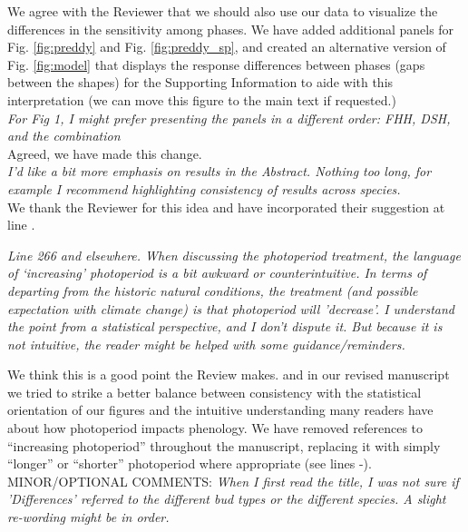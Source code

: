 \documentclass[11pt]{article}
\begin{document}
We agree with the Reviewer that we should also use our data to visualize the differences in the sensitivity among phases. We have added additional panels for Fig. \ref{fig:preddy} and Fig. \ref{fig:preddy_sp}, and created an alternative version of Fig. \ref{fig:model} that displays the response differences between phases (gaps between the shapes) for the Supporting Information to aide with this interpretation (we can move this figure to the main text if requested.) \\ %

\emph{For Fig 1, I might prefer presenting the panels in a different order: FHH, DSH, and the combination}\\

Agreed, we have made this change.\\

\emph{I’d like a bit more emphasis on results in the Abstract. Nothing too long, for example I recommend highlighting consistency of results across species.}\\

We thank the Reviewer for this idea and have incorporated their suggestion at line .

\emph{Line 266 and elsewhere. When discussing the photoperiod treatment, the language of ‘increasing’ photoperiod is a bit awkward or counterintuitive. In terms of departing from the historic natural conditions, the treatment (and possible expectation with climate change) is that photoperiod will 'decrease'. I understand the point from a statistical perspective, and I don’t dispute it. But because it is not intuitive, the reader might be helped with some guidance/reminders.}

We think this is a good point the Review makes. and in our revised manuscript we tried to strike a better balance between consistency with the statistical orientation of our figures and the intuitive understanding many readers have about how photoperiod impacts phenology. We have removed references to ``increasing photoperiod'' throughout the manuscript, replacing it with simply ``longer'' or ``shorter'' photoperiod where appropriate (see lines -).\\


MINOR/OPTIONAL COMMENTS:
\emph{When I first read the title, I was not sure if 'Differences' referred to the different bud types or the different species. A slight re-wording might be in order.}
\end{document}
